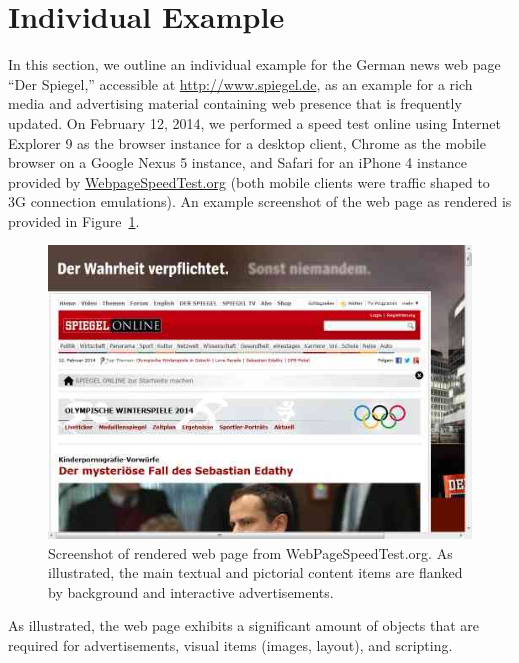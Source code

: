 \documentclass[letterpaper,conference]{IEEEtran}
\begin{document}





\section{Individual Example}
\label{s:example}
In this section, we outline an individual example for the German news web page ``Der Spiegel,'' accessible at \url{http://www.spiegel.de}, as an example for a rich media and advertising material containing web presence that is frequently updated.
On February 12, 2014, we performed a speed test online using Internet Explorer 9 as the browser instance for a desktop client, Chrome as the mobile browser on a Google Nexus 5 instance, and Safari for an iPhone 4 instance provided by \url{WebpageSpeedTest.org} (both mobile clients were traffic shaped to 3G connection emulations).
An example screenshot of the web page as rendered is provided in Figure~\ref{fig:screens}.
\begin{figure}
	\centering
	\includegraphics[width=.9\linewidth]{1screen}
	\caption{Screenshot of rendered web page from WebPageSpeedTest.org. As illustrated, the main textual and pictorial content items are flanked by background and interactive advertisements.}
	\label{fig:screens}
\end{figure}
As illustrated, the web page exhibits a significant amount of objects that are required for advertisements, visual items (images, layout), and scripting.
\end{document}
